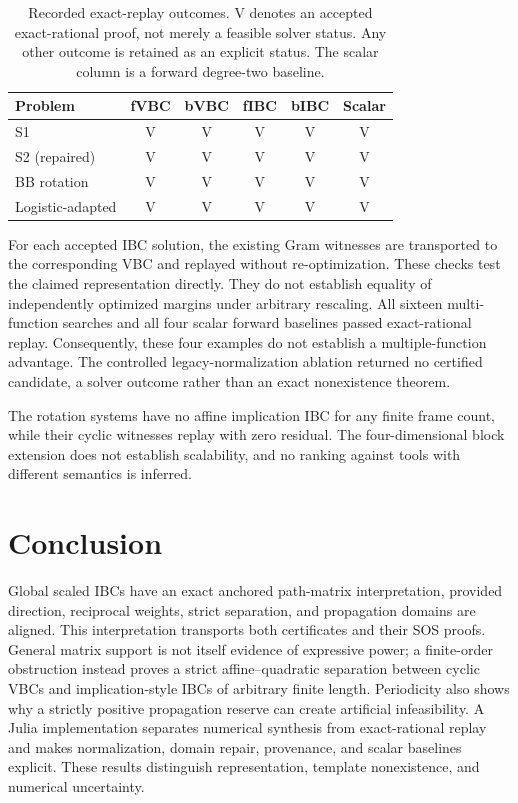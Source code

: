 \documentclass[5p,times]{elsarticle}
\theoremstyle{definition}\newtheorem{definition}[theorem]{Definition}
\theoremstyle{remark}\newtheorem{remark}[theorem]{Remark}
\begin{document}
\begin{table}[t]
\centering\small
\caption{Recorded exact-replay outcomes. V denotes an accepted exact-rational proof, not merely a feasible solver status. Any other outcome is retained as an explicit status. The scalar column is a forward degree-two baseline.}\label{tab:results}
\begin{tabular}{lccccc}\toprule
Problem & fVBC & bVBC & fIBC & bIBC & Scalar\\\midrule
S1 & V & V & V & V & V\\
S2 (repaired) & V & V & V & V & V\\
BB rotation & V & V & V & V & V\\
Logistic-adapted & V & V & V & V & V\\
\bottomrule\end{tabular}
\end{table}

For each accepted IBC solution, the existing Gram witnesses are transported to the corresponding VBC and replayed without re-optimization. These checks test the claimed representation directly. They do not establish equality of independently optimized margins under arbitrary rescaling. All sixteen multi-function searches and all four scalar forward baselines passed exact-rational replay. Consequently, these four examples do not establish a multiple-function advantage. The controlled legacy-normalization ablation returned no certified candidate, a solver outcome rather than an exact nonexistence theorem.

The rotation systems have no affine implication IBC for any finite frame count, while their cyclic witnesses replay with zero residual. The four-dimensional block extension does not establish scalability, and no ranking against tools with different semantics is inferred.

\section{Conclusion}
Global scaled IBCs have an exact anchored path-matrix interpretation, provided direction, reciprocal weights, strict separation, and propagation domains are aligned. This interpretation transports both certificates and their SOS proofs. General matrix support is not itself evidence of expressive power; a finite-order obstruction instead proves a strict affine--quadratic separation between cyclic VBCs and implication-style IBCs of arbitrary finite length. Periodicity also shows why a strictly positive propagation reserve can create artificial infeasibility. A Julia implementation separates numerical synthesis from exact-rational replay and makes normalization, domain repair, provenance, and scalar baselines explicit. These results distinguish representation, template nonexistence, and numerical uncertainty.
\end{document}
